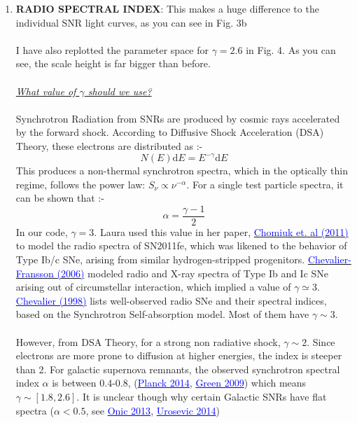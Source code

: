 \documentclass[10pt,a4paper]{article}
\begin{document}
\begin{enumerate}
\item \textbf{RADIO SPECTRAL INDEX}: This makes a huge difference to the individual SNR light curves, as you can see in Fig. 3b\\\\
I have also replotted the parameter space for $\gamma = 2.6$ in Fig. 4. As you can see, the scale height is far bigger than before.\\\\
\newpage
\textit{\underline{What value of $\gamma$ should we use?}}\\\\
Synchrotron Radiation from SNRs are produced by cosmic rays accelerated by the forward shock. According to Diffusive Shock Acceleration (DSA) Theory, these electrons are distributed as :-
\begin{equation}
N(E) \mathrm{d}E = E^{-\gamma} \mathrm{d}E
\end{equation}
This produces a non-thermal synchrotron spectra, which in the optically thin regime, follows the power law: $S_\nu \propto \nu^{-\alpha}$. For a single test particle spectra, it can be shown that :-
\begin{equation}
\alpha = \frac{\gamma - 1}{2}
\end{equation}
In our code, $\gamma = 3$. Laura used this value in her paper, \href{http://adsabs.harvard.edu/abs/2012ApJ...750..164C}{\textcolor{blue}{Chomiuk et. al (2011)}} to model the radio spectra of SN2011fe, which was likened to the behavior of Type Ib/c SNe, arising from similar hydrogen-stripped progenitors. \href{http://adsabs.harvard.edu/abs/2006ApJ...651..381C}{\textcolor{blue}{Chevalier-Fransson (2006)}} modeled radio and X-ray spectra of Type Ib and Ic SNe arising out of circumstellar interaction, which implied a value of $\gamma \simeq 3$. \href{http://adsabs.harvard.edu/abs/1998ApJ...499..810C}{\textcolor{blue}{Chevalier (1998)}} lists well-observed radio SNe and their spectral indices, based on the Synchrotron Self-absorption model. Most of them have $\gamma \sim 3$.\\\\
However, from DSA Theory, for a strong non radiative shock, $\gamma \sim 2$. Since electrons are more prone to diffusion at higher energies, the index is steeper than 2. For galactic supernova remnants, the observed synchrotron spectral index $\alpha$ is between 0.4-0.8, (\href{http://arxiv.org/abs/1409.5746}{\textcolor{blue}{Planck 2014}}, \href{http://adsabs.harvard.edu/abs/2009BASI...37...45G}{\textcolor{blue}{Green 2009}}) which means $\gamma \sim [1.8,2.6]$. It is unclear though why certain Galactic SNRs have flat spectra ($\alpha < 0.5$, see \href{http://arxiv.org/abs/1304.1766}{\textcolor{blue}{Onic 2013}}, \href{http://arxiv.org/abs/1408.1107}{\textcolor{blue}{Urosevic 2014}})\\


\end{enumerate}
\end{document}
